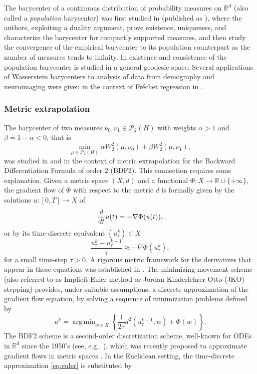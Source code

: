 \documentclass[12pt,a4paper]{article}
\DeclareMathOperator*{\argmin}{arg\,min}
\newcommand{\R}{\mathbb{R}}
\renewcommand{\d}{{\rm d}}
\newcommand{\X}{\mathcal{P}_2(H)}
\theoremstyle{plain}
\theoremstyle{definition}
\begin{document}
The barycenter of a continuous distribution of probability measures on $\R^d$ (also called a \emph{population} barycenter) was first studied in \cite{bigot2012} (published as \cite{bigot2018}), where the authors, exploiting a duality argument, prove existence, uniqueness, and characterize the barycenter for compactly supported measures, and then study the convergence of the empirical barycenter to its population counterpart as the number of measures tends to infinity. In \cite{legouic} existence and consistence of the population barycenter is studied in a general geodesic space. Several applications of Wasserstein barycenters to analysis of data from demography and neuroimaging were given in the context of Fr\'echet regression in \cite{petersen}.


\subsubsection*{Metric extrapolation} The barycenter of two measures $\nu_0,\nu_1 \in \X$ with weights $\alpha>1$ and $\beta=1-\alpha<0$, that is
\begin{equation}
\label{eq:main}
	\min_{\mu\in \X} \alpha W_2^2(\mu,\nu_0) +\beta W_2^2(\mu,\nu_1),
\end{equation}
was studied in \cite{matthes-plazotta} and \cite{gallouet2024} in the context of metric extrapolation for the Backward Differentiation Formula of order 2 (BDF2). This connection requires some explanation. Given a metric space $(X,d)$ and a functional $\Phi:X\to \R\cup\{+\infty\}$, the gradient flow of $\Phi$ with respect to the metric $d$ is formally given by the solutions $u:[0,T]\to X$ of
\[    
	\frac{\d}{\d t} u(t) = -\nabla \Phi(u(t)),    
\]
or by its time-discrete equivalent $(u^k_\tau)\in X$
\begin{equation}
\label{eq:euler}
    \frac{u^k_\tau-u^{k-1}_\tau}{\tau} \approx -\nabla \Phi(u^k_\tau),
\end{equation}
for a small time-step $\tau>0$. A rigorous metric framework for the derivatives that appear in these equations was established in \cite{ambrosio-gigli-savare}. The minimizing movement scheme (also referred to as Implicit Euler method or Jordan-Kinderlehrer-Otto (JKO) stepping) provides, under suitable assumptions, a discrete approximation of the gradient flow equation, by solving a sequence of minimization problems defined by
\[    	
	u^k = \argmin_{w \in X}\left\{ \frac{1}{2\tau}d^2(u^{k-1}_\tau,w) +\Phi(w)\right\}.
\]
The BDF2 scheme is a second-order discretization scheme, well-known for ODEs in $\R^d$ since the 1950's (see, e.g., \cite{dahlquist1956}), which was recently proposed to approximate gradient flows in metric spaces \cite{matthes-plazotta}. In the Euclidean setting, the time-discrete  approximation \eqref{eq:euler} is substituted by
\end{document}
